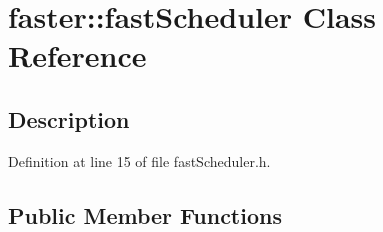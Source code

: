 \hypertarget{classfaster_1_1fastScheduler}{}\section{faster\+:\+:fast\+Scheduler Class Reference}
\label{classfaster_1_1fastScheduler}


\subsection{Description}


Definition at line 15 of file fast\+Scheduler.\+h.

\subsection*{Public Member Functions}
